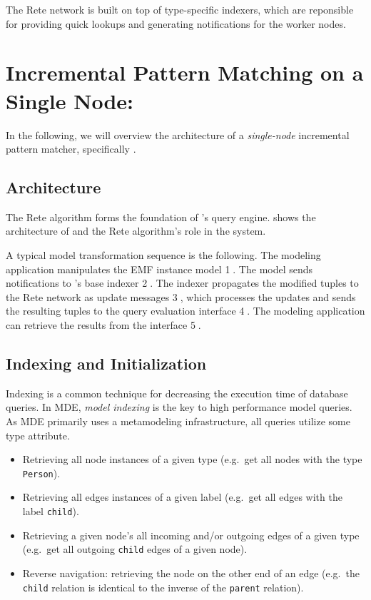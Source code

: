 The Rete network is built on top of type-specific indexers, which are reponsible for providing quick lookups and generating notifications for the worker nodes.




\section{Incremental Pattern Matching on a Single Node: \eiq{}}
\label{eiq-architecture}

In the following, we will overview the architecture of a \emph{single-node} incremental pattern matcher, specifically \eiq{}.

\subsection{Architecture}

The Rete algorithm forms the foundation of \eiq{}'s query engine.  shows the architecture of \eiq{} and the Rete algorithm's role in the system. 


A typical model transformation sequence is the following. The modeling application manipulates the EMF instance model \textcircled{1}. The model sends notifications to \eiq{}'s base indexer \textcircled{2}. The indexer propagates the modified tuples to the Rete network as update messages \textcircled{3}, which processes the updates and sends the resulting tuples to the query evaluation interface \textcircled{4}. The modeling application can retrieve the results from the interface \textcircled{5}.

\subsection{Indexing and Initialization}
\label{indexing}

Indexing is a common technique for decreasing the execution time of database queries. In MDE, \emph{model indexing} is the key to high performance model queries. As MDE primarily uses a metamodeling infrastructure, all queries utilize some type attribute.

\begin{itemize}
  \item Retrieving all node instances of a given type (e.g.\ get all nodes with the type \texttt{Person}).
  \item Retrieving all edges instances of a given label (e.g.\ get all edges with the label \texttt{child}).
  \item Retrieving a given node's all incoming and/or outgoing edges of a given type (e.g.\ get all outgoing \texttt{child} edges of a given node). 
  \item Reverse navigation: retrieving the node on the other end of an edge (e.g.\ the \texttt{child} relation is identical to the inverse of the \texttt{parent} relation). 
\end{itemize}

